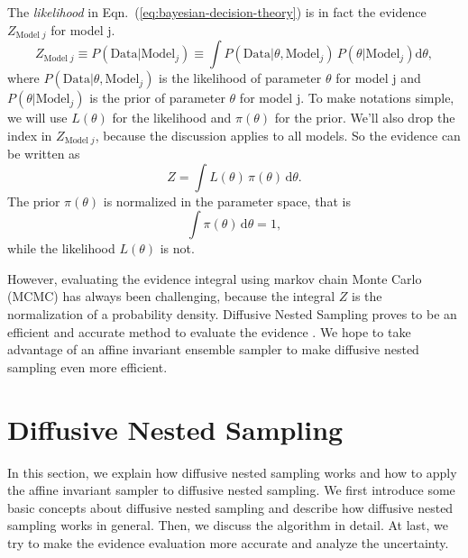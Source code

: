 \documentclass[letterpaper, preprint]{aastex}
\begin{document}
The \textit{likelihood} in Eqn.~(\ref{eq:bayesian-decision-theory}) is in fact the evidence $Z_{\mathrm{Model}\;j}$ for model j.
\begin{equation}
Z_{\mathrm{Model}\;j} \equiv P(\mathrm{Data}|\mathrm{Model}_j) \equiv \int P(\mathrm{Data}|\theta, \mathrm{Model}_j) \, P(\theta|\mathrm{Model}_j)\mathrm{d}\theta,
\end{equation}
where $P(\mathrm{Data}|\theta, \mathrm{Model}_j)$ is the likelihood of parameter $\theta$ for model j and $P(\theta|\mathrm{Model}_j)$ is the prior of parameter $\theta$ for model j. To make notations simple, we will use $L(\theta)$ for the likelihood and $\pi(\theta)$ for the prior. We'll also drop the index in $Z_{\mathrm{Model}\;j}$, because the discussion applies to all models. So the evidence can be written as
\begin{equation}
Z=\int\! L(\theta)\,\pi(\theta)\,\mathrm{d}\theta.
\end{equation}
The prior $\pi(\theta)$ is normalized in the parameter space, that is
\begin{equation}
\int\!\pi(\theta)\,\mathrm{d}\theta=1,
\end{equation}
while the likelihood $L(\theta)$ is not.

However, evaluating the evidence integral using markov chain Monte Carlo (MCMC) has always been challenging, because the integral $Z$ is the normalization of a probability density. Diffusive Nested Sampling proves to be an efficient and accurate method to evaluate the evidence \citep{brewer11a}. We hope to take advantage of an affine invariant ensemble sampler \citep{goodman10a, hou12a, foreman-mackey13a} to make diffusive nested sampling even more efficient.


\section{Diffusive Nested Sampling}

In this section, we explain how diffusive nested sampling works and how to apply the affine invariant sampler to diffusive nested sampling. We first introduce some basic concepts about diffusive nested sampling and describe how diffusive nested sampling works in general. Then, we discuss the algorithm in detail. At last, we try to make the evidence evaluation more accurate and analyze the uncertainty. 
\end{document}

